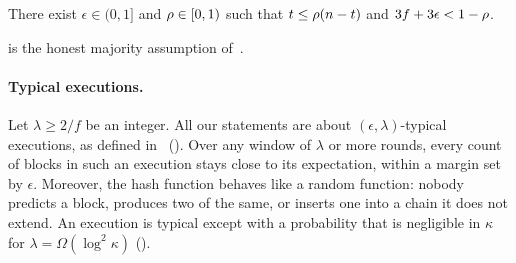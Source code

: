 \begin{assumption}\label{asm.majority}
    There exist $\epsilon\in(0,1]$ and $\rho\in[0,1)$ such that
    $t\le\rho(n-t)$ and $3f+3\epsilon<1-\rho$.
\end{assumption}

 is the honest majority assumption of~\cite{gkl24}.

\paragraph{Typical executions.}

Let $\lambda\ge2/f$ be an integer. All our statements are about
$(\epsilon,\lambda)$-typical executions, as defined in~\cite{gkl24}
(). Over any window of $\lambda$ or more rounds, every count
of blocks in such an execution stays close to its expectation, within a margin
set by $\epsilon$. Moreover, the hash function behaves like a random function:
nobody predicts a block, produces two of the same, or inserts one into a chain
it does not extend. An execution is typical except with a probability that is
negligible in $\kappa$ for $\lambda=\Omega(\log^2\kappa)$ ().
